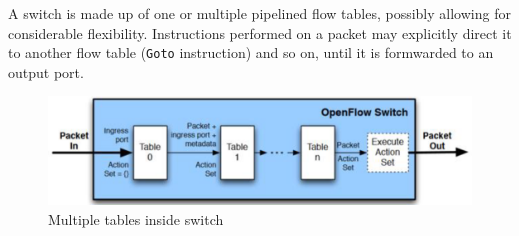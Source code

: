 A switch is made up of one or multiple pipelined flow tables, possibly allowing for considerable flexibility.
Instructions performed on a packet may explicitly direct it to another flow table (\texttt{Goto} instruction) and so on, until it is formwarded to an output port.
\begin{figure}[htbp]
   \centering
   \includegraphics{images/openflow_switchtables.png}
   \caption{Multiple tables inside switch}
   \label{fig:openflow_switchtables}
\end{figure}


